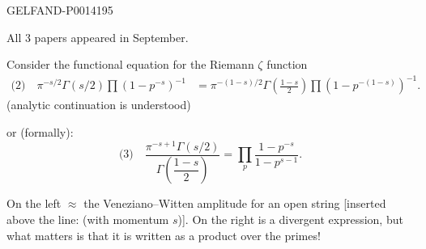 \begin{GelfandAdjacentEvidence}{GELFAND-P001419}{5}


All 3 papers appeared in September.


Consider the functional equation for the Riemann \(\zeta\) function
\[
\begin{aligned}
\text{(2)}\quad\pi^{-s/2}\Gamma(s/2)\prod(1-p^{-s})^{-1}
&=\pi^{-(1-s)/2}\Gamma\left(\frac{1-s}{2}\right)
\prod(1-p^{-(1-s)})^{-1}.
\end{aligned}
\]
(analytic continuation is understood)

or (formally):
\[
\text{(3)}\quad
\frac{\pi^{-s+1}\Gamma(s/2)}{\Gamma\left(\dfrac{1-s}{2}\right)}
=\prod_p\frac{1-p^{-s}}{1-p^{s-1}}.
\]
\end{GelfandAdjacentEvidence}


On the left \(\approx\) the Veneziano–Witten amplitude for an open string [inserted above the line: (with momentum \(s\))].
On the right is a divergent expression, but what matters is that it is written as a product over the primes!


